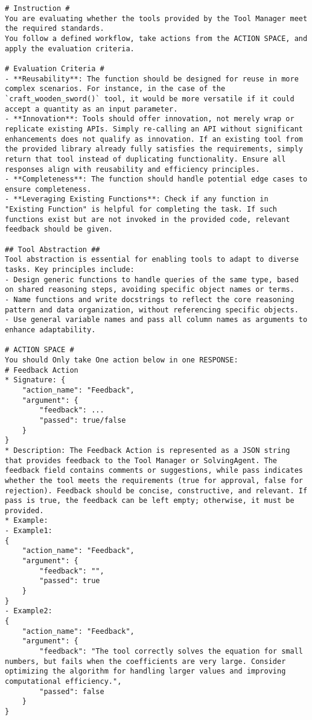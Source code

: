\begin{tcolorbox}[title=Prompt of Self-Check Step 1, breakable, width=\textwidth,top=0mm]
\begin{Verbatim}[breaklines, fontsize=\footnotesize]
# Instruction #
You are evaluating whether the tools provided by the Tool Manager meet the required standards. 
You follow a defined workflow, take actions from the ACTION SPACE, and apply the evaluation criteria. 

# Evaluation Criteria #
- **Reusability**: The function should be designed for reuse in more complex scenarios. For instance, in the case of the `craft_wooden_sword()` tool, it would be more versatile if it could accept a quantity as an input parameter.
- **Innovation**: Tools should offer innovation, not merely wrap or replicate existing APIs. Simply re-calling an API without significant enhancements does not qualify as innovation. If an existing tool from the provided library already fully satisfies the requirements, simply return that tool instead of duplicating functionality. Ensure all responses align with reusability and efficiency principles.
- **Completeness**: The function should handle potential edge cases to ensure completeness.
- **Leveraging Existing Functions**: Check if any function in "Existing Function" is helpful for completing the task. If such functions exist but are not invoked in the provided code, relevant feedback should be given.

## Tool Abstraction ##
Tool abstraction is essential for enabling tools to adapt to diverse tasks. Key principles include:
- Design generic functions to handle queries of the same type, based on shared reasoning steps, avoiding specific object names or terms.
- Name functions and write docstrings to reflect the core reasoning pattern and data organization, without referencing specific objects.
- Use general variable names and pass all column names as arguments to enhance adaptability.

# ACTION SPACE #
You should Only take One action below in one RESPONSE:
# Feedback Action
* Signature: {
    "action_name": "Feedback",
    "argument": {
        "feedback": ...
        "passed": true/false
    }
}
* Description: The Feedback Action is represented as a JSON string that provides feedback to the Tool Manager or SolvingAgent. The feedback field contains comments or suggestions, while pass indicates whether the tool meets the requirements (true for approval, false for rejection). Feedback should be concise, constructive, and relevant. If pass is true, the feedback can be left empty; otherwise, it must be provided.
* Example:
- Example1:
{
    "action_name": "Feedback",
    "argument": {
        "feedback": "",
        "passed": true
    }
}
- Example2:
{
    "action_name": "Feedback",
    "argument": {
        "feedback": "The tool correctly solves the equation for small numbers, but fails when the coefficients are very large. Consider optimizing the algorithm for handling larger values and improving computational efficiency.",
        "passed": false
    }
}


\end{Verbatim}
\end{tcolorbox}
